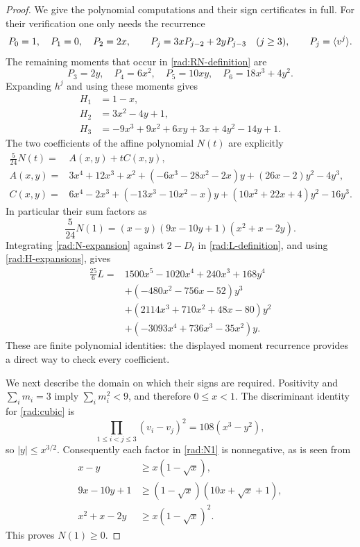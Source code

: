 \begin{proof}
We give the polynomial computations and their sign certificates in full.
For their verification one only needs the recurrence
\[
 P_0=1,\quad P_1=0,\quad P_2=2x,\qquad
 P_j=3xP_{j-2}+2yP_{j-3}\quad(j\geq3),
 \qquad P_j=\langle v^j\rangle.
\]
The remaining moments that occur in \eqref{rad:RN-definition} are
\[
 P_3=2y,\quad P_4=6x^2,\quad P_5=10xy,\quad
 P_6=18x^3+4y^2.
\]
Expanding $h^j$ and using these moments gives
\begin{equation}\label{rad:H-expansions}
\begin{aligned}
 H_1&=1-x,\\
 H_2&=3x^2-4y+1,\\
 H_3&=-9x^3+9x^2+6xy+3x+4y^2-14y+1.
\end{aligned}
\end{equation}
The two coefficients of the affine polynomial $N(t)$ are explicitly
\begin{equation}\label{rad:N-expansion}
\begin{aligned}
 \frac5{24}N(t)={}&A(x,y)+t C(x,y),\\
 A(x,y)={}&3x^4+12x^3+x^2
   +(-6x^3-28x^2-2x)y+(26x-2)y^2-4y^3,\\
 C(x,y)={}&6x^4-2x^3
   +(-13x^3-10x^2-x)y+(10x^2+22x+4)y^2-16y^3.
\end{aligned}
\end{equation}
In particular their sum factors as
\begin{equation}\label{rad:N1}
 \frac5{24}N(1)=(x-y)(9x-10y+1)(x^2+x-2y).
\end{equation}
Integrating \eqref{rad:N-expansion} against $2-D_t$ in
\eqref{rad:L-definition}, and using \eqref{rad:H-expansions}, gives
\begin{equation}\label{rad:L-expansion}
\begin{aligned}
 \frac{25}{6}L={}&1500x^5-1020x^4+240x^3+168y^4\\
 &+(-480x^2-756x-52)y^3\\
 &+(2114x^3+710x^2+48x-80)y^2\\
 &+(-3093x^4+736x^3-35x^2)y.
\end{aligned}
\end{equation}
These are finite polynomial identities: the displayed moment recurrence
provides a direct way to check every coefficient.

We next describe the domain on which their signs are required.  Positivity
and $\sum_i m_i=3$ imply $\sum_i m_i^2<9$, and therefore $0\leq x<1$.
The discriminant identity for \eqref{rad:cubic} is
\[
 \prod_{1\leq i<j\leq3}(v_i-v_j)^2=108(x^3-y^2),
\]
so $|y|\leq x^{3/2}$.  Consequently each factor in \eqref{rad:N1} is
nonnegative, as is seen from
\begin{align*}
 x-y&\geq x(1-\sqrt{x}),\\
 9x-10y+1&\geq(1-\sqrt{x})(10x+\sqrt{x}+1),\\
 x^2+x-2y&\geq x(1-\sqrt{x})^2.
\end{align*}
This proves $N(1)\geq0$.


\end{proof}

